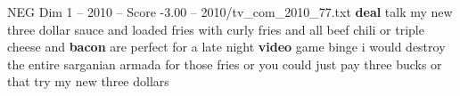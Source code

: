 \begin{textsample}{NEG Dim 1 – 2010 – Score -3.00 – 2010/tv\_com\_2010\_77.txt}  \label{ex:f1_neg_032}
\textbf{deal} talk my new three dollar sauce and loaded fries with curly fries and all beef chili or triple cheese and \textbf{bacon} are perfect for a late night \textbf{video} game binge i would destroy the entire sarganian armada for those fries or you could just pay three bucks or that try my new three dollars

\end{textsample}
